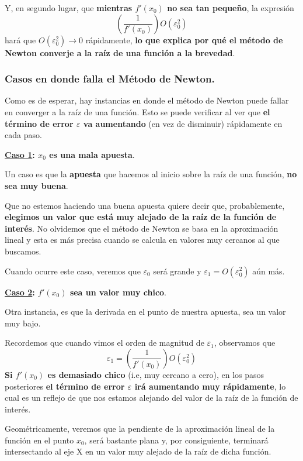 \documentclass[12pt]{article}
\begin{document}
\newpage

Y, en segundo lugar, que \textbf{mientras $f'(x_{0})$ no sea tan pequeño}, la expresión
\[\left(\frac{1}{f'(x_{0})}\right)O(\varepsilon_{0}^{2})\]
hará que $O(\varepsilon_{0}^{2}) \to 0$ rápidamente, \textbf{lo que explica por qué el método de Newton converje a la raíz de una función a la brevedad}.


\subsubsection{Casos en donde falla el Método de Newton.}

Como es de esperar, hay instancias en donde el método de Newton puede fallar en converger a la raíz de una función. Esto se puede verificar al ver que \textbf{el término de error $\varepsilon$ va aumentando} (en vez de disminuir) rápidamente en cada paso.

\textbf{\underline{Caso 1}: $x_{0}$ es una mala apuesta}.

Un caso es que la \textbf{apuesta} que hacemos al inicio sobre la raíz de una función, \textbf{no sea muy buena}.

Que no estemos haciendo una buena apuesta quiere decir que, probablemente, \textbf{elegimos un valor que está muy alejado de la raíz de la función de interés}. No olvidemos que el método de Newton se basa en la aproximación lineal y esta es más precisa cuando se calcula en valores muy cercanos al que buscamos.

Cuando ocurre este caso, veremos que $\varepsilon_{0}$ será grande y $\varepsilon_{1} = O(\varepsilon^{2}_{0})$ aún más.

\textbf{\underline{Caso 2}: $f'(x_{0})$ sea un valor muy chico}.

Otra instancia, es que la derivada en el punto de nuestra apuesta, sea un valor muy bajo.

Recordemos que cuando vimos el orden de magnitud de $\varepsilon_{1}$, observamos que
\[\varepsilon_{1} = \left(\frac{1}{f'(x_{0})}\right)O(\varepsilon_{0}^{2})\]
\textbf{Si $f'(x_{0})$ es demasiado chico} (i.e, muy cercano a cero), en los pasos posteriores \textbf{el término de error $\varepsilon$ irá aumentando muy rápidamente}, lo cual es un reflejo de que nos estamos alejando del valor de la raíz de la función de interés.

Geométricamente, veremos que la pendiente de la aproximación lineal de la función en el punto $x_{0}$, será bastante plana y, por consiguiente, terminará intersectando al eje X en un valor muy alejado de la raíz de dicha función.
\end{document}
